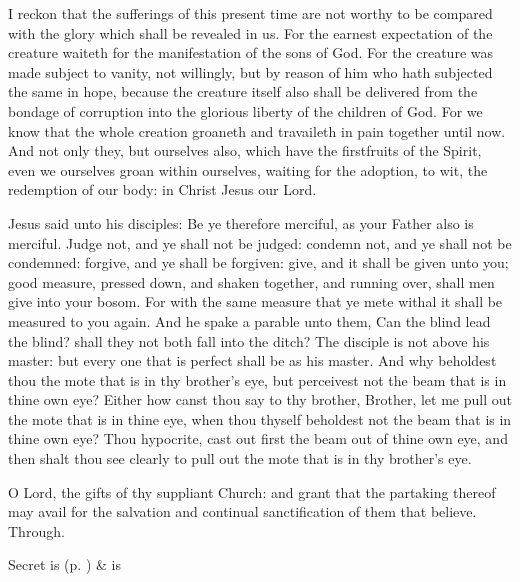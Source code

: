  I reckon that the sufferings of this present time are not worthy to be compared with the glory which shall be revealed in us. For the earnest expectation of the creature waiteth for the manifestation of the sons of God. For the creature was made subject to vanity, not willingly, but by reason of him who hath subjected the same in hope, because the creature itself also shall be delivered from the bondage of corruption into the glorious liberty of the children of God. For we know that the whole creation groaneth and travaileth in pain together until now. And not only they, but ourselves also, which have the firstfruits of the Spirit, even we ourselves groan within ourselves, waiting for the adoption, to wit, the redemption of our body: in Christ Jesus our Lord.


 Jesus said unto his disciples: Be ye therefore merciful, as your Father also is merciful. Judge not, and ye shall not be judged: condemn not, and ye shall not be condemned: forgive, and ye shall be forgiven: give, and it shall be given unto you; good measure, pressed down, and shaken together, and running over, shall men give into your bosom. For with the same measure that ye mete withal it shall be measured to you again. And he spake a parable unto them, Can the blind lead the blind? shall they not both fall into the ditch? The disciple is not above his master: but every one that is perfect shall be as his master. And why beholdest thou the mote that is in thy brother's eye, but perceivest not the beam that is in thine own eye? Either how canst thou say to thy brother, Brother, let me pull out the mote that is in thine eye, when thou thyself beholdest not the beam that is in thine own eye? Thou hypocrite, cast out first the beam out of thine own eye, and then shalt thou see clearly to pull out the mote that is in thy brother's eye.


\secret
{} O Lord, the gifts of thy suppliant Church: and grant that the partaking thereof may avail for the salvation and continual sanctification of them that believe. Through.
\begin{rubric}
     Secret is  (p. \pageref{SPSaints}) \&  is 
\end{rubric}


